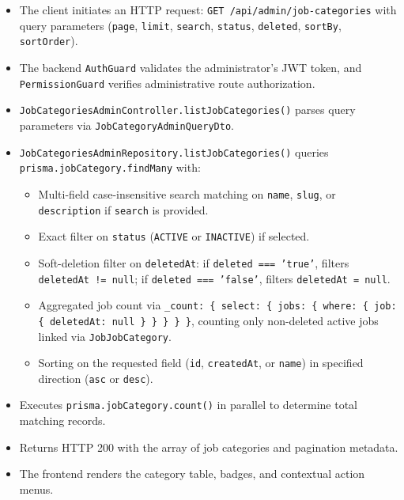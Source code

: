 \begin{itemize}[leftmargin=1.6em,topsep=3pt,itemsep=2pt,parsep=0pt,label=$\bullet$]
    \item The client initiates an HTTP request: \texttt{GET /api/admin/job-categories} with query parameters (\texttt{page}, \texttt{limit}, \texttt{search}, \texttt{status}, \texttt{deleted}, \texttt{sortBy}, \texttt{sortOrder}).
    \item The backend \texttt{AuthGuard} validates the administrator's JWT token, and \texttt{PermissionGuard} verifies administrative route authorization.
    \item \texttt{Job\allowbreak{}Categories\allowbreak{}Admin\allowbreak{}Controller.\allowbreak{}list\allowbreak{}Job\allowbreak{}Categories()} parses query parameters via \texttt{Job\allowbreak{}Category\allowbreak{}Admin\allowbreak{}Query\allowbreak{}Dto}.
    \item \texttt{Job\allowbreak{}Categories\allowbreak{}Admin\allowbreak{}Repository.\allowbreak{}list\allowbreak{}Job\allowbreak{}Categories()} queries \texttt{prisma.\allowbreak{}jobCategory.\allowbreak{}findMany} with:
        \begin{itemize}[leftmargin=1.6em,topsep=2pt,itemsep=2pt,parsep=0pt]
            \item Multi-field case-insensitive search matching on \texttt{name}, \texttt{slug}, or \texttt{description} if \texttt{search} is provided.
            \item Exact filter on \texttt{status} (\texttt{ACTIVE} or \texttt{INACTIVE}) if selected.
            \item Soft-deletion filter on \texttt{deletedAt}: if \texttt{deleted === 'true'}, filters \texttt{deletedAt != null}; if \texttt{deleted === 'false'}, filters \texttt{deletedAt = null}.
            \item Aggregated job count via \texttt{\_count: \{ select: \{ jobs: \{ where: \{ job: \{ deletedAt: null \} \} \} \} \}}, counting only non-deleted active jobs linked via \texttt{JobJobCategory}.
            \item Sorting on the requested field (\texttt{id}, \texttt{createdAt}, or \texttt{name}) in specified direction (\texttt{asc} or \texttt{desc}).
        \end{itemize}
    \item Executes \texttt{prisma.jobCategory.count()} in parallel to determine total matching records.
    \item Returns HTTP 200 with the array of job categories and pagination metadata.
    \item The frontend renders the category table, badges, and contextual action menus.
\end{itemize}

